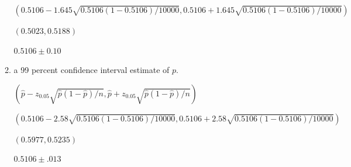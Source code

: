 \documentclass{article}
\begin{document}
\begin{enumerate}
\begin{enumerate}
        $(0.5106 - 1.645\sqrt{0.5106(1-0.5106)/10000}, 0.5106 + 1.645\sqrt{0.5106(1-0.5106)/10000})$

        $(0.5023, 0.5188)$

        $0.5106 \pm 0.10$
        \item a 99 percent confidence interval estimate of $p$.
        
        $(\hat{p} - z_{0.05}\sqrt{\hat{p}(1-\hat{p})/n}, \hat{p} + z_{0.05}\sqrt{\hat{p}(1-\hat{p})/n})$\

        $(0.5106 - 2.58\sqrt{0.5106(1-0.5106)/10000}, 0.5106 + 2.58\sqrt{0.5106(1-0.5106)/10000})$

        $(0.5977, 0.5235)$

        $0.5106 \pm .013$
    \end{enumerate}
\end{enumerate}
\end{document}
